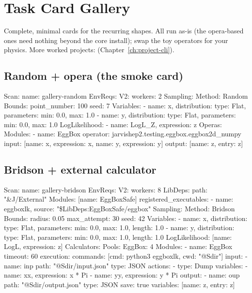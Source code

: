 \chapter{Task Card Gallery}
\label{app:gallery}

Complete, minimal cards for the recurring shapes. All run as-is (the opera-based ones
need nothing beyond the core install); swap the toy operators for your physics. More
worked projects:  (Chapter~\ref{ch:project-cli}).

\section{Random + opera (the smoke card)}

\begin{yamlwin}
Scan: {name: gallery-random}
EnvReqs:
  V2: {workers: 2}
Sampling:
  Method: Random
  Bounds:
    point_number: 100
    seed: 7
  Variables:
    - {name: x, distribution: {type: Flat, parameters: {min: 0.0, max: 1.0}}}
    - {name: y, distribution: {type: Flat, parameters: {min: 0.0, max: 1.0}}}
  LogLikelihood:
    - {name: LogL_Z, expression: z}
Operas:
  Modules:
    - name: EggBox
      operator: jarvishep2.testing.eggbox.eggbox2d_numpy
      input:  [{name: x, expression: x}, {name: y, expression: y}]
      output: [{name: z, entry: z}]
\end{yamlwin}

\section{Bridson + external calculator}

\begin{yamlwin}
Scan: {name: gallery-bridson}
EnvReqs:
  V2: {workers: 8}
LibDeps:
  path: "&J/External"
  Modules: [{name: EggBoxSafe}]
  registered_executables:
    - {name: eggboxlk, source: "\${LibDeps:EggBoxSafe}/eggbox"}
Sampling:
  Method: Bridson
  Bounds:
    radius: 0.05
    max_attempt: 30
    seed: 42
  Variables:
    - {name: x, distribution: {type: Flat,
         parameters: {min: 0.0, max: 1.0, length: 1.0}}}
    - {name: y, distribution: {type: Flat,
         parameters: {min: 0.0, max: 1.0, length: 1.0}}}
  LogLikelihood: [{name: LogL, expression: z}]
Calculators:
  Pools: {EggBox: 4}
  Modules:
    - name: EggBox
      timeout: 60
      execution:
        commands: [{cmd: python3 eggboxlk, cwd: "@Sdir"}]
        input:
          - name: inp
            path: "@Sdir/input.json"
            type: JSON
            actions:
              - type: Dump
                variables:
                  - {name: xx, expression: x * Pi}
                  - {name: yy, expression: y * Pi}
        output:
          - name: oup
            path: "@Sdir/output.json"
            type: JSON
            save: true
            variables: [{name: z, entry: z}]
\end{yamlwin}

